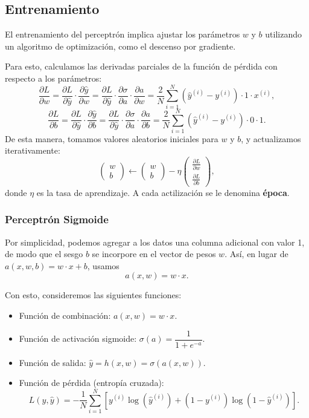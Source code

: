 \documentclass[a4,11pt]{aleph-notas}
\begin{document}
\subsection*{Entrenamiento}

El entrenamiento del perceptrón implica ajustar los parámetros \(w\) y \(b\) utilizando un algoritmo de optimización, como el descenso por gradiente.

Para esto, calculamos las derivadas parciales de la función de pérdida con respecto a los parámetros:
\[
    \frac{\partial L}{\partial w} 
    = \frac{\partial L}{\partial \hat y} \cdot \frac{\partial \hat y}{\partial w}
    = \frac{\partial L}{\partial \hat y} \cdot \frac{\partial \sigma}{\partial a} \cdot \frac{\partial a}{\partial w}
    = \frac{2}{N} \sum_{i=1}^N ( \hat y^{(i)} - y^{(i)} ) \cdot 1 \cdot x^{(i)},
\]
\[
    \frac{\partial L}{\partial b} 
    = \frac{\partial L}{\partial \hat y} \cdot \frac{\partial \hat y}{\partial b}
    = \frac{\partial L}{\partial \hat y} \cdot \frac{\partial \sigma}{\partial a} \cdot \frac{\partial a}{\partial b}
    = \frac{2}{N} \sum_{i=1}^N ( \hat y^{(i)} - y^{(i)} ) \cdot 0 \cdot 1.
\]
De esta manera, tomamos valores aleatorios iniciales para \(w\) y \(b\), y actualizamos iterativamente:
\[
    \begin{pmatrix}
        w \\ b
    \end{pmatrix}
    \leftarrow
    \begin{pmatrix}
        w \\ b
    \end{pmatrix}
    - \eta
    \begin{pmatrix}
        \frac{\partial L}{\partial w} \\[6pt]
        \frac{\partial L}{\partial b}
    \end{pmatrix},
\]
donde \(\eta\) es la tasa de aprendizaje. A cada actilización se le denomina \textbf{época}.

\subsubsection*{Perceptrón Sigmoide}

Por simplicidad, podemos agregar a los datos una columna adicional con valor 1, de modo que el sesgo \(b\) se incorpore en el vector de pesos \(w\). Así, en lugar de \(a(x,w,b) = w\cdot  x + b\), usamos
\[
    a(x,w) = w\cdot  x.
\]

Con esto, consideremos las siguientes funciones:
\begin{itemize}
    \item Función de combinación: \(a(x,w) = w\cdot  x\).
    \item Función de activación sigmoide: \(\sigma(a) = \dfrac{1}{1 + e^{-a}}\).
    \item Función de salida: \(\hat y = h(x,w) = \sigma(a(x,w))\).
    \item Función de pérdida (entropía cruzada):
    \[
        L(y,\hat y) = -\frac{1}{N} \sum_{i=1}^N \left[ y^{(i)} \log(\hat y^{(i)}) + (1 - y^{(i)}) \log(1 - \hat y^{(i)}) \right].
    \]
\end{itemize}
\end{document}
